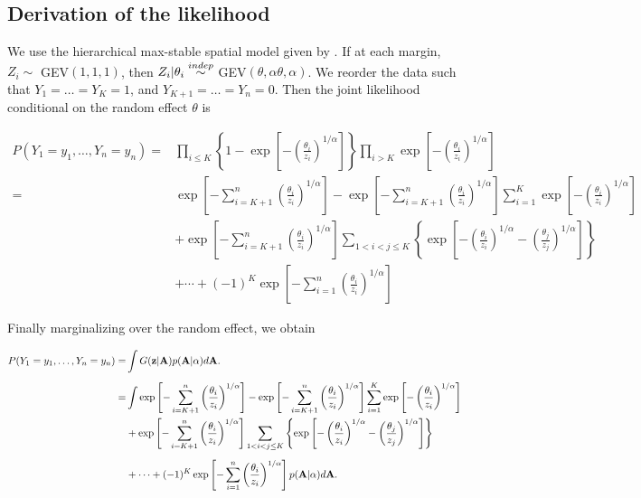 \documentclass[11pt]{article}
\begin{document}
\subsection{Derivation of the likelihood} \label{rba:likelihoodderivation}
We use the hierarchical max-stable spatial model given by \citet{Reich2012}. If at each margin, $Z_i \sim $ GEV$(1,1,1)$, then $Z_i | \theta_i \stackrel{indep}{\sim} $ GEV$(\theta, \alpha \theta, \alpha)$. We reorder the data such that $Y_1=\ldots=Y_K=1$, and $Y_{K+1} = \ldots = Y_n = 0$. Then the joint likelihood conditional on the random effect $\theta$ is

\begin{align} \label{rbeq:joint_cond}
	P(Y_1=y_1,\ldots,Y_n=y_n) =& \prod_{ i \le K } \left\{ 1 - \exp \left[ - \left( \frac{ \theta_i }{ z_i } \right)^{ 1/\alpha} \right] \right \} \prod_{ i > K } \exp \left[ -\left( \frac{ \theta_i }{ z_i } \right)^{1/\alpha} \right] \nonumber \\[0.5em]
		=& \exp \left[ -\sum_{ i = K+1}^{ n }\left( \frac{ \theta_i }{ z_i } \right)^{1/\alpha} \right] - \exp \left[ -\sum_{ i = K+1}^{ n }\left( \frac{ \theta_i }{ z_i } \right)^{1/\alpha} \right] \sum_{ i = 1}^{K} \exp\left[ -\left( \frac{ \theta_i }{ z_i } \right)^{ 1/\alpha} \right] \nonumber\\
		&  + \exp \left[ -\sum_{ i = K+1}^{ n }\left( \frac{ \theta_i }{ z_i } \right)^{1/\alpha} \right] \sum_{ 1 < i < j \le K } \left\{ \exp \left[ - \left( \frac{ \theta_i }{ z_i } \right)^{ 1/\alpha} - \left( \frac{ \theta_j }{ z_j } \right)^{ 1/\alpha } \right] \right \} \nonumber \\[0.5em]
		& + \cdots + (-1)^K \exp\left[ - \sum_{ i = 1 }^{ n }\left( \frac{ \theta_i }{ z_i } \right)^{ 1/\alpha} \right]
\end{align}

Finally marginalizing over the random effect, we obtain

\begin{align} \label{rbeq:joint}
    P(Y_1=y_1,\ldots,Y_n=y_n) =&\int G(\mbox{\bf z} | \mbox{\bf A}) p( \mbox{\bf A} | \alpha) d\mbox{\bf A}. \nonumber\\[0.5em]
			=& \int \exp \left[ -\sum_{ i = K+1}^{ n }\left( \frac{ \theta_i }{ z_i } \right)^{1/\alpha} \right] - \exp \left[ -\sum_{ i = K+1}^{ n }\left( \frac{ \theta_i }{ z_i } \right)^{1/\alpha} \right] \sum_{ i = 1}^{K} \exp\left[ -\left( \frac{ \theta_i }{ z_i } \right)^{ 1/\alpha} \right] \nonumber\\
		&  + \exp \left[ -\sum_{ i = K+1}^{ n }\left( \frac{ \theta_i }{ z_i } \right)^{1/\alpha} \right] \sum_{ 1 < i < j \le K } \left\{ \exp \left[ - \left( \frac{ \theta_i }{ z_i } \right)^{ 1/\alpha} - \left( \frac{ \theta_j }{ z_j } \right)^{ 1/\alpha } \right] \right \} \nonumber \\[0.5em]
		& + \cdots + (-1)^K \exp\left[ - \sum_{ i = 1 }^{ n }\left( \frac{ \theta_i }{ z_i } \right)^{ 1/\alpha} \right] p( \mbox{\bf A} | \alpha) d\mbox{\bf A}.
\end{align}
\end{document}
